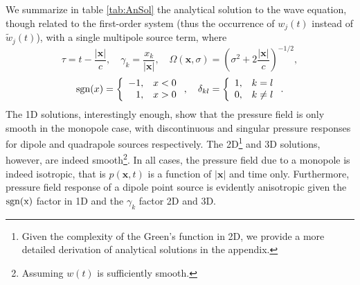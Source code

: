 We summarize in table \ref{tab:AnSol} the analytical solution to the wave equation, though related to the first-order system (thus the occurrence of $w_j(t)$ instead of $\tilde w_j(t)$), with a single multipole source term, where
\[
	\tau = t - \frac{|\mathbf x|}{c},
	\quad
	\gamma_k = \frac{x_k}{|\mathbf x|},
	\quad
	\Omega(\mathbf x,\sigma) = \left( \sigma^2 + 2\frac{|\mathbf x|}{c} \right)^{-1/2},
\]
\[
	{\rm sgn}(x) = \left\{ \begin{array}{rl}
		-1,& x<0\\
		1,& x>0
	\end{array}\right.,
	\quad 
	\delta_{kl} = \left\{ \begin{array}{rl}
		1,& k=l\\
		0,& k\neq l 
	\end{array}\right..
\]
The 1D solutions, interestingly enough, show that the pressure field is only smooth in the monopole case, with discontinuous and singular pressure responses for dipole and quadrapole sources respectively. 
The 2D\footnote{Given the complexity of the Green's function in 2D, we provide a more detailed derivation of analytical solutions in the appendix.} and 3D solutions, however,  are indeed smooth\footnote{Assuming $w(t)$ is sufficiently smooth.}.
In all cases, the pressure field due to a monopole is indeed isotropic, that is $p(\mathbf x,t)$ is a function of $|\mathbf x|$ and time only.
Furthermore, pressure field response of a dipole point source is evidently anisotropic given the $\rm{sgn}(x)$ factor in 1D and the $\gamma_k$ factor 2D and 3D.


